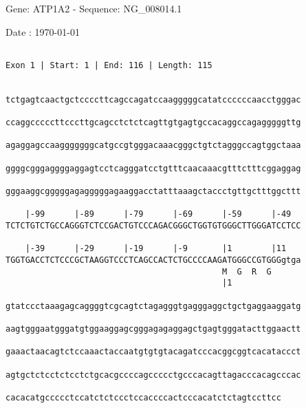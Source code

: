 \documentclass{article}
\begin{document}
\begin{center}
\begin{large}
 Gene: ATP1A2 - Sequence: NG\_008014.1
 
 Date : \today
\end{large}
\end{center}
 \begin{Verbatim}
 
Exon 1 | Start: 1 | End: 116 | Length: 115


tctgagtcaactgctccccttcagccagatccaagggggcatatccccccaacctgggac
                                                            
ccaggcccccttcccttgcagcctctctcagttgtgagtgccacaggccagagggggttg
                                                            
agaggagccaagggggggcatgccgtgggacaaacgggctgtctagggccagtggctaaa
                                                            
ggggcgggaggggaggagtcctcagggatcctgtttcaacaaacgtttctttcggaggag
                                                            
gggaaggcgggggagagggggagaaggacctatttaaagctaccctgttgctttggcttt
                                                            
    |-99      |-89      |-79      |-69      |-59      |-49  
TCTCTGTCTGCCAGGGTCTCCGACTGTCCCAGACGGGCTGGTGTGGGCTTGGGATCCTCC
                                                            
    |-39      |-29      |-19      |-9       |1        |11   
TGGTGACCTCTCCCGCTAAGGTCCCTCAGCCACTCTGCCCCAAGATGGGCCGTGGGgtga
                                            M  G  R  G      
                                            |1             
  
gtatccctaaagagcaggggtcgcagtctagagggtgagggaggctgctgaggaaggatg
                                                            
aagtgggaatgggatgtggaaggagcgggagagaggagctgagtgggatacttggaactt
                                                            
gaaactaacagtctccaaactaccaatgtgtgtacagatcccacggcggtcacataccct
                                                            
agtgctctcctctcctctgcacgccccagccccctgcccacagttagacccacagcccac
                                                            
cacacatgccccctccatctctccctccaccccactcccacatctctagtccttcc
                                                        

\end{Verbatim}
\end{document}
